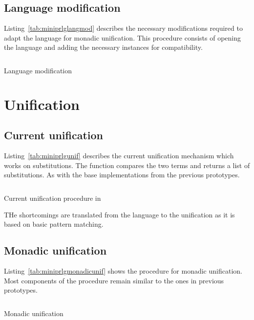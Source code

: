 \documentclass[thesis-solanki.tex]{files}
\begin{document}
\subsection{Language modification}
Listing~\ref{tab:miniprlglangmod} describes the necessary modifications required to adapt the language for monadic unification.
This procedure consists of opening the language and adding the necessary instances for  \cite{unification-fd-lib}
compatibility.

\begin{code-list}[H]
\begin{singlespace}
  \inputminted[linenos, firstline=64, lastline=87]{haskell}{haskell-proto3-uplift-apart.hs}
\end{singlespace}
\caption{Language modification}
\label{tab:miniprlglangmod}
\end{code-list}

\section{Unification}

\subsection{Current unification}

Listing~\ref{tab:miniprlgunif} describes the current unification mechanism which works on  substitutions. The 
 function compares the two terms and returns a list of substitutions. As with the base implementations from
the previous prototypes.

\begin{code-list}[H]
\begin{singlespace}
  \inputminted[linenos, firstline=67, lastline=95]{haskell}{haskell-proto3-pentyl-skater.hs}
\end{singlespace}
\caption{Current unification procedure in \cite{website:mini-prolog-hugs98}}
\label{tab:miniprlgunif}
\end{code-list}

THe shortcomings are translated from the language to the unification as it is based on basic pattern matching.

\subsection{Monadic unification}
Listing~\ref{tab:miniprlgmonadicunif} shows the procedure for monadic unification. Most components of the procedure remain similar to the ones
in previous prototypes.
\begin{code-list}[H]
\begin{singlespace}
  \inputminted[linenos, firstline=1, lastline=42]{haskell}{haskell-proto3-bevy-icebox.hs}
\end{singlespace}
\caption{Monadic unification}
\label{tab:miniprlgmonadicunif}
\end{code-list}
\end{document}
